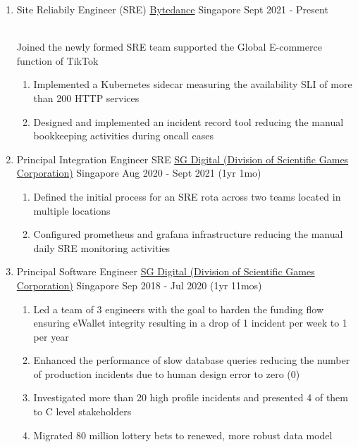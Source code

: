 \documentclass{CVSoftwareEngineer}
\begin{document}
	\begin{enumerate}[labelwidth=!, labelindent=0pt, leftmargin=*, rightmargin=15pt]
		\item[] \cvExperience
			{Site Reliabily Engineer (SRE)}
			{\href{https://www.bytedance.com/en}{Bytedance}}
			{Singapore}
			{Sept 2021 - Present}
			{
				\\ Joined the newly formed SRE team supported the Global E-commerce function of TikTok
				\begin{enumerate}[labelwidth=!, labelindent=0pt, nosep, leftmargin=*]
					\item[\textasteriskcentered] Implemented a Kubernetes sidecar measuring the availability SLI of more than 200 HTTP services
					\item[\textasteriskcentered] Designed and implemented an incident record tool reducing the manual bookkeeping activities during oncall cases
				\end{enumerate}
			}

		\item[] \cvExperience
			{Principal Integration Engineer \textbar SRE}
			{\href{https://www.sgdigital.com/}{SG Digital (Division of Scientific Games Corporation)}}
			{Singapore}
			{Aug 2020 - Sept 2021 (1yr 1mo)}
			{\begin{enumerate}[labelwidth=!, labelindent=0pt, nosep, leftmargin=*]
					\item[\textasteriskcentered] Defined the initial process for an SRE rota across two teams located in multiple locations
					\item[\textasteriskcentered] Configured prometheus and grafana infrastructure reducing the manual daily SRE monitoring activities
				\end{enumerate}
			}

		\item[] \cvExperience
			{Principal Software Engineer}
			{\href{https://www.sgdigital.com/}{SG Digital (Division of Scientific Games Corporation)}}
			{Singapore}
			{Sep 2018 - Jul 2020 (1yr 11mos)}
			{\begin{enumerate}[labelwidth=!, labelindent=0pt, nosep, leftmargin=*]
					\item[\textasteriskcentered] Led a team of 3 engineers with the goal to harden the
						funding flow ensuring eWallet integrity resulting in a drop of 1 incident per week
						to 1 per year
					\item[\textasteriskcentered] Enhanced the performance of slow database queries reducing
						the number of production incidents due to human design error to zero (0)
					\item[\textasteriskcentered] Investigated more than 20 high profile incidents and
						presented 4 of them to C level stakeholders
					\item[\textasteriskcentered] Migrated 80 million lottery bets to renewed,
						more robust data model
				\end{enumerate}
			}


\end{enumerate}
\end{document}
